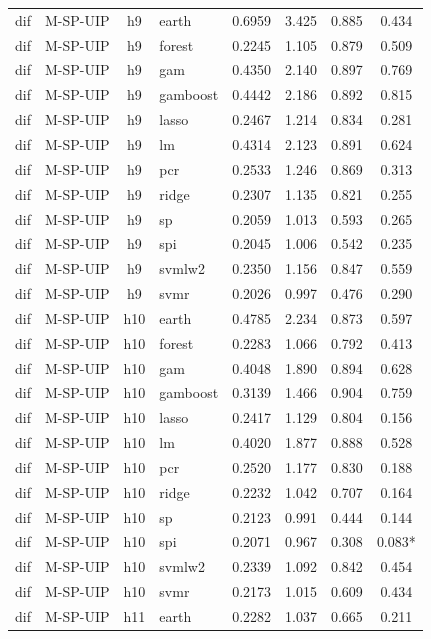 \begin{ThreePartTable}
\begin{longtable}[t]{llclcccc}
dif & M-SP-UIP & h9 & earth & 0.6959 & 3.425 & 0.885 & 0.434\\
dif & M-SP-UIP & h9 & forest & 0.2245 & 1.105 & 0.879 & 0.509\\
dif & M-SP-UIP & h9 & gam & 0.4350 & 2.140 & 0.897 & 0.769\\
dif & M-SP-UIP & h9 & gamboost & 0.4442 & 2.186 & 0.892 & 0.815\\
dif & M-SP-UIP & h9 & lasso & 0.2467 & 1.214 & 0.834 & 0.281\\
dif & M-SP-UIP & h9 & lm & 0.4314 & 2.123 & 0.891 & 0.624\\
dif & M-SP-UIP & h9 & pcr & 0.2533 & 1.246 & 0.869 & 0.313\\
dif & M-SP-UIP & h9 & ridge & 0.2307 & 1.135 & 0.821 & 0.255\\
dif & M-SP-UIP & h9 & sp & 0.2059 & 1.013 & 0.593 & 0.265\\
dif & M-SP-UIP & h9 & spi & 0.2045 & 1.006 & 0.542 & 0.235\\
dif & M-SP-UIP & h9 & svmlw2 & 0.2350 & 1.156 & 0.847 & 0.559\\
dif & M-SP-UIP & h9 & svmr & 0.2026 & 0.997 & 0.476 & 0.290\\
\addlinespace
dif & M-SP-UIP & h10 & earth & 0.4785 & 2.234 & 0.873 & 0.597\\
dif & M-SP-UIP & h10 & forest & 0.2283 & 1.066 & 0.792 & 0.413\\
dif & M-SP-UIP & h10 & gam & 0.4048 & 1.890 & 0.894 & 0.628\\
dif & M-SP-UIP & h10 & gamboost & 0.3139 & 1.466 & 0.904 & 0.759\\
dif & M-SP-UIP & h10 & lasso & 0.2417 & 1.129 & 0.804 & 0.156\\
dif & M-SP-UIP & h10 & lm & 0.4020 & 1.877 & 0.888 & 0.528\\
dif & M-SP-UIP & h10 & pcr & 0.2520 & 1.177 & 0.830 & 0.188\\
dif & M-SP-UIP & h10 & ridge & 0.2232 & 1.042 & 0.707 & 0.164\\
dif & M-SP-UIP & h10 & sp & 0.2123 & 0.991 & 0.444 & 0.144\\
dif & M-SP-UIP & h10 & spi & 0.2071 & 0.967 & 0.308 & 0.083*\\
dif & M-SP-UIP & h10 & svmlw2 & 0.2339 & 1.092 & 0.842 & 0.454\\
dif & M-SP-UIP & h10 & svmr & 0.2173 & 1.015 & 0.609 & 0.434\\
\addlinespace
dif & M-SP-UIP & h11 & earth & 0.2282 & 1.037 & 0.665 & 0.211\\

\end{longtable}
\end{ThreePartTable}
